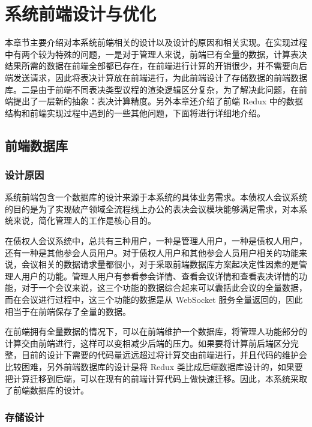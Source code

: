 
\chapter{系统前端设计与优化}
本章节主要介绍对本系统前端相关的设计以及设计的原因和相关实现。在实现过程中有两个较为特殊的问题，一是对于管理人来说，前端已有全量的数据，计算表决结果所需的数据在前端全部都已存在，在前端进行计算的开销很少，并不需要向后端发送请求，因此将表决计算放在前端进行，为此前端设计了存储数据的前端数据库。二是由于前端不同表决类型议程的渲染逻辑区分复杂，为了解决此问题，在前端提出了一层新的抽象：表决计算精度。另外本章还介绍了前端 Redux 中的数据结构和前端实现过程中遇到的一些其他问题，下面将进行详细地介绍。

\section{前端数据库}

\subsection{设计原因}

系统前端包含一个数据库的设计来源于本系统的具体业务需求。本债权人会议系统的目的是为了实现破产领域全流程线上办公的表决会议模块能够满足需求，对本系统来说，简化管理人的工作是核心目的。

在债权人会议系统中，总共有三种用户，一种是管理人用户，一种是债权人用户，还有一种是其他参会人员用户。对于债权人用户和其他参会人员用户相关的功能来说，会议相关的数据请求量都很小，对于采取前端数据库方案起决定性因素的是管理人用户的功能。管理人用户有参看参会详情、查看会议详情和查看表决详情的功能，对于一个会议来说，这三个功能的数据综合起来可以囊括此会议的全量数据，而在会议进行过程中，这三个功能的数据是从 WebSocket 服务全量返回的，因此相当于在前端保存了全量的数据。

在前端拥有全量数据的情况下，可以在前端维护一个数据库，将管理人功能部分的计算交由前端进行，这样可以变相减少后端的压力。如果要将计算前后端区分完整，目前的设计下需要的代码量远远超过将计算交由前端进行，并且代码的维护会比较困难，另外前端数据库的设计是将 Redux 类比成后端数据库设计的，如果要把计算迁移到后端，可以在现有的前端计算代码上做快速迁移。因此，本系统采取了前端数据库的设计。

\subsection{存储设计}


